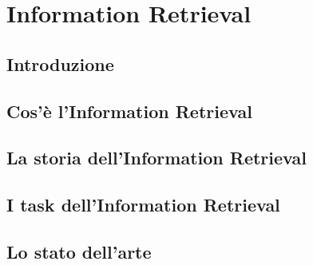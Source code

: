 \chapter{Information Retrieval}\label{Information_Retrieval}
\section{Introduzione}\label{Information_Retrieval:Introduzione}
\section{Cos'è l'Information Retrieval}
\section{La storia dell'Information Retrieval}
\section{I task dell'Information Retrieval}
\section{Lo stato dell'arte}